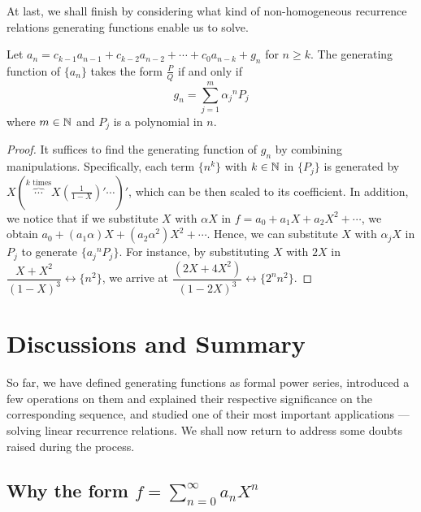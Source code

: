 \documentclass[a4paper, 12pt]{report}
\begin{document}
At last, we shall finish by considering what kind of non-homogeneous recurrence relations generating functions enable us to solve.
\begin{thm}
Let $a_n = c_{k - 1}a_{n - 1} + c_{k - 2}a_{n - 2} + \cdots + c_0 a_{n - k} + g_n$ for $n \geq k$. The generating function of $\{a_n\}$ takes the form $\frac{P}{Q}$ if and only if \[g_n = \sum_{j = 1}^{m} {\alpha_j}^n P_j\]
where $m \in \mathbb{N}$ and $P_j$ is a polynomial in $n$.
\end{thm}
\begin{proof}
It suffices to find the generating function of $g_n$ by combining manipulations. Specifically, each term $\{n^k\}$ with $k \in \mathbb{N}$ in $\{P_j\}$ is generated by $X\left(\overbrace{\cdots}^{k \text{ times}} X\left(\frac{1}{1 - X}\right)'\cdots\right)'$, which can be then scaled to its coefficient. In addition, we notice that if we substitute $X$ with $\alpha X$ in $f = a_0 + a_1 X + a_2 X^2 + \cdots$, we obtain $a_0 + (a_1 \alpha) X + (a_2 \alpha^2) X^2 + \cdots$. Hence, we can substitute $X$ with $\alpha_j X$ in $P_j$ to generate $\{{a_j}^n P_j\}$. For instance, by substituting $X$ with $2X$ in $\dfrac{X + X^2}{(1 - X)^3} \longleftrightarrow \{n^2\}$, we arrive at $\dfrac{(2X + 4X^2)}{(1 - 2X)^3} \longleftrightarrow \{2^n n^2\}$.
\end{proof}

{\let\clearpage\relax\chapter{Discussions and Summary}}\vspace{-0.7cm}
% 

So far, we have defined generating functions as formal power series, introduced a few operations on them and explained their respective significance on the corresponding sequence, and studied one of their most important applications --- solving linear recurrence relations. We shall now return to address some doubts raised during the process.
\clearpage
\section{Why the form \texorpdfstring{$f = \sum_{n = 0}^\infty a_n X^n$}}
\end{document}
